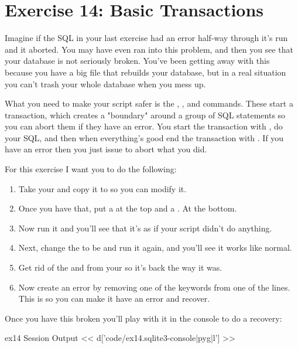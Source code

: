 \chapter{Exercise 14: Basic Transactions}

Imagine if the SQL in your last exercise had an error half-way through it's run
and it aborted.  You may have even ran into this problem, and then you see that
your database is not seriously broken.  You've been getting away with this
because you have a big  file that rebuilds your database, but in
a real situation you can't trash your whole database when you mess up.

What you need to make your script safer is the , ,
and  commands.  These start a transaction, which creates a
"boundary" around a group of SQL statements so you can abort them if they have
an error.  You start the transaction with , do your SQL, and then
when everything's good end the transaction with .  If you have
an error then you just issue  to abort what you did.

For this exercise I want you to do the following:

\begin{enumerate}
\item Take your  and copy it to  so you can modify it.
\item Once you have that, put a  at the top and a .  At
    the bottom.
\item Now run it and you'll see that it's as if your script didn't do
    anything.
\item Next, change the  to be  and run it
    again, and you'll see it works like normal.
\item Get rid of the  and  from your  so
    it's back the way it was.
\item Now create an error by removing one of the  keywords from
    one of the lines.  This is so you can make it have an error and recover.
\end{enumerate}

Once you have this broken  you'll play with it in the 
console to do a recovery:

\begin{code}{ex14 Session Output}
<< d['code/ex14.sqlite3-console|pyg|l'] >>
\end{code}

